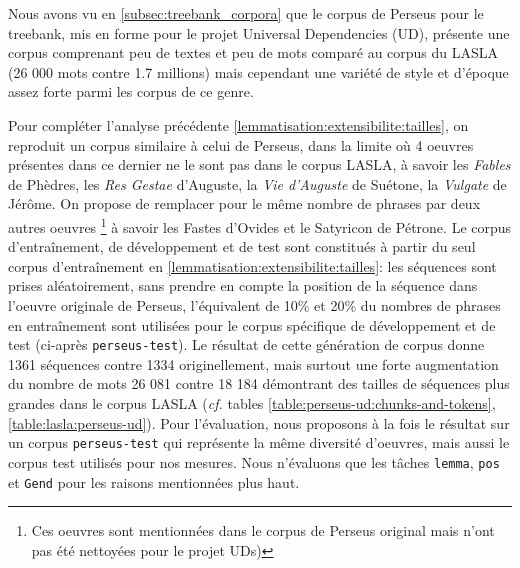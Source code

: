 Nous avons vu en \ref{subsec:treebank_corpora} que le corpus de Perseus pour le treebank, mis en forme pour le projet Universal Dependencies (\Gls{UD}), présente une corpus comprenant peu de textes et peu de mots comparé au corpus du LASLA (26 000 mots contre 1.7 millions) mais cependant une variété de style et d'époque assez forte parmi les corpus de ce genre.

\newpara

Pour compléter l'analyse précédente \ref{lemmatisation:extensibilite:tailles}, on reproduit un corpus similaire à celui de Perseus, dans la limite où 4 oeuvres présentes dans ce dernier ne le sont pas dans le corpus LASLA, à savoir les \textit{Fables} de Phèdres, les \textit{Res Gestae} d'Auguste, la \textit{Vie d'Auguste} de Suétone, la \textit{Vulgate} de Jérôme. On propose de remplacer pour le même nombre de phrases par deux autres oeuvres \footnote{Ces oeuvres sont mentionnées dans le corpus de Perseus original mais n'ont pas été nettoyées pour le projet \Glspl{UD})} à savoir les Fastes d'Ovides et le Satyricon de Pétrone. Le corpus d'entraînement, de développement et de test sont constitués à partir du seul corpus d'entraînement en \ref{lemmatisation:extensibilite:tailles}: les séquences sont prises aléatoirement, sans prendre en compte la position de la séquence dans l'oeuvre originale de Perseus, l'équivalent de 10\% et 20\% du nombres de phrases en entraînement sont utilisées pour le corpus spécifique de développement et de test (ci-après \texttt{perseus-test}). Le résultat de cette génération de corpus donne 1361 séquences contre 1334 originellement, mais surtout une forte augmentation du nombre de mots 26 081 contre 18 184 démontrant des tailles de séquences plus grandes dans le corpus LASLA (\textit{cf.} tables \ref{table:perseus-ud:chunks-and-tokens}, \ref{table:lasla:perseus-ud}).  Pour l'évaluation, nous proposons à la fois le résultat sur un corpus \texttt{perseus-test} qui représente la même diversité d'oeuvres, mais aussi le corpus test utilisés pour nos mesures. Nous n'évaluons que les tâches \texttt{lemma}, \texttt{pos} et \texttt{Gend} pour les raisons mentionnées plus haut. 

\newpara


